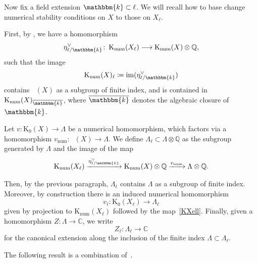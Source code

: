\documentclass[11pt, reqno]{amsart}
\numberwithin{equation}{section}
\theoremstyle{plain}
\theoremstyle{remark}
\theoremstyle{definition}
\theoremstyle{italicsname}
\newcommand{\num}{\mathrm{num}}
\DeclareMathOperator{\Knum}{\rK_{\num}}
\newcommand{\rK}{\mathrm{K}}
\newcommand{\KK}{\mathbbm{k}}
\def\CC{\ensuremath{\mathbb{C}}}
\def\QQ{\ensuremath{\mathbb{Q}}}
\begin{document}
Now fix a field extension $\KK \subset \ell$. 
We will recall how to base change numerical stability conditions on $X$ to those on $X_{\ell}$. 

First, by \cite[Proposition and Definition 12.15]{stability-families}, we have a homomorphism
\[
\eta^{\vee}_{\ell/\KK}\colon\Knum(X_{\ell})\longrightarrow\Knum(X)\otimes\QQ,
\]
such that the image 
\begin{equation}
\label{Knumell}
\Knum(X)_{\ell}\coloneqq\mathrm{im}(\eta^{\vee}_{\ell/\KK})
\end{equation}
contains $\Knum(X)$ as a subgroup of finite index, and is contained in $\Knum(X)_{\overline{\KK}}$, where $\overline{\KK}$ denotes the algebraic closure of $\KK$.

Let $v \colon \rK_0(X) \to \Lambda$ be a numerical homomorphism, which factors via a homomorphism $v_{\num} \colon \Knum(X) \to \Lambda$. 
We define $\Lambda_{\ell} \subset \Lambda \otimes {\QQ}$ as the subgroup generated by $\Lambda$ and the image of the map 
\begin{equation}
\label{KXell}
    \Knum(X_{\ell}) \xrightarrow{ \eta^{\vee}_{\ell/\KK}} \Knum(X) \otimes \QQ \xrightarrow{v_{\num}} \Lambda \otimes {\QQ}. 
\end{equation}

Then, by the previous paragraph, $\Lambda_{\ell}$ contains $\Lambda$ as a subgroup of finite index. 
Moreover, by construction there is an induced numerical homomorphism  
\begin{equation*}
    v_{\ell} \colon \rK_0(X_{\ell}) \to \Lambda_{\ell}
\end{equation*}
given by projection to $\rK_{\num}(X_{\ell})$ followed by the map~\eqref{KXell}. 
Finally, given a homomorphism $Z \colon \Lambda \to \CC$, we write
\begin{equation*}
    Z_{\ell} \colon \Lambda_{\ell} \to \CC 
\end{equation*}
for the canonical extension along the inclusion of the finite index $\Lambda \subset \Lambda_{\ell}$. 

The following result is a combination of~\cite[Theorem 5.3, Proposition 5.9, Theorem 12.17]{stability-families}. 
\end{document}

